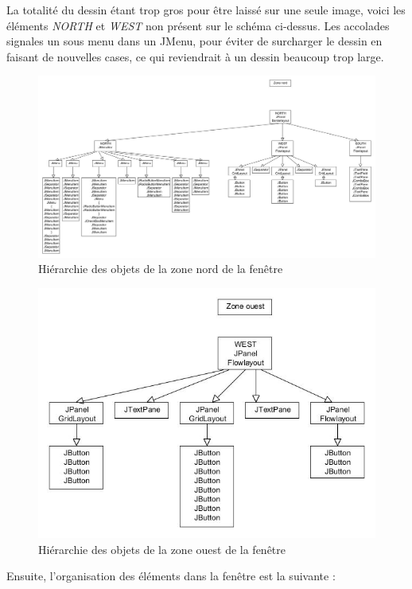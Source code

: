 \documentclass[12pt, a4paper]{article}
\begin{document}
La totalité du dessin étant trop gros pour être laissé sur une seule image, voici les éléments \emph{NORTH} et \emph{WEST} non présent sur le schéma ci-dessus. Les accolades signales un sous menu dans un JMenu, pour éviter de surcharger le dessin en faisant de nouvelles cases, ce qui reviendrait à un dessin beaucoup trop large.
\newpage
\begin{figure}[h]
\begin{center}
   \includegraphics[scale = 0.35]{arbre_jframe_nord.jpg}
	\caption{Hiérarchie des objets de la zone nord de la fenêtre}
	\end{center}
\end{figure}

\begin{figure}[!h]
\begin{center}
   \includegraphics[scale = 0.7]{arbre_jframe_ouest.jpg}
	\caption{Hiérarchie des objets de la zone ouest de la fenêtre}
	\end{center}
\end{figure}
\newpage
Ensuite, l'organisation des éléments dans la fenêtre est la suivante :
\end{document}
